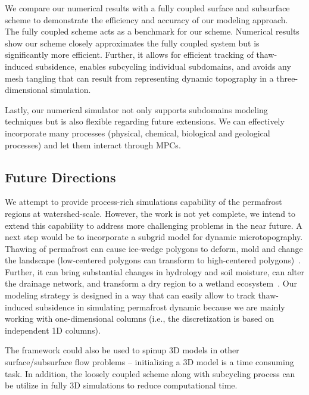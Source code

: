 \documentclass[review]{elsarticle}
\begin{document}
We compare our numerical results with a fully coupled surface and subsurface scheme to demonstrate the efficiency and accuracy of our modeling approach. The fully coupled scheme acts as a benchmark for our scheme. Numerical results show our scheme closely approximates the fully coupled system but is significantly more efficient. Further, it allows for efficient tracking of thaw-induced subsidence, enables subcycling individual subdomains, and avoids any mesh tangling that can result from representing dynamic topography in a three-dimensional simulation.

Lastly, our numerical simulator not only supports subdomains modeling techniques but is also flexible regarding future extensions. We can effectively incorporate many processes (physical, chemical, biological and geological processes) and let them interact through MPCs. 
 

 
\subsection{Future Directions}
We attempt to provide process-rich simulations capability of the permafrost regions at watershed-scale. However, the work is not yet complete, we intend to  extend this capability to address more challenging problems in the near future. A next step would be to incorporate a subgrid model for dynamic microtopography. Thawing of permafrost can cause ice-wedge polygons to deform, mold and change the landscape (low-centered polygons can transform to high-centered polygons)~\cite{jorgenson2006abrupt,liljedahl2012ice}. Further, it can bring substantial changes in hydrology and soil moisture, can alter the drainage network, and transform a dry region to a wetland ecosystem~\cite{hinzman2005evidence,rowland2010arctic}. Our modeling strategy is designed in a way that can easily allow to track thaw-induced subsidence in simulating permafrost dynamic because we are mainly working with one-dimensional columns (i.e., the discretization is based on independent 1D columns).

The framework could also be used to spinup 3D models in other surface/subsurface flow problems -- initializing a 3D model is a time consuming task. In addition, the loosely coupled scheme along with subcycling process can be utilize in fully 3D simulations to reduce computational time. 



\end{document}
